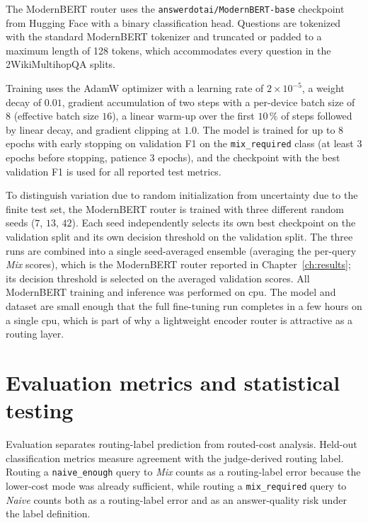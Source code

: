 \documentclass[english, bibtex]{kththesis}               %
\numberwithin{listing}{chapter}
\begin{document}
The ModernBERT router uses the \texttt{answerdotai/ModernBERT-base} checkpoint from Hugging Face \cite{warner2024modernbert} with a binary classification head. Questions are tokenized with the standard ModernBERT tokenizer and truncated or padded to a maximum length of 128 tokens, which accommodates every question in the 2WikiMultihopQA splits.

Training uses the AdamW optimizer \cite{loshchilov2019decoupled} with a learning rate of $2 \times 10^{-5}$, a weight decay of $0.01$, gradient accumulation of two steps with a per-device batch size of $8$ (effective batch size $16$), a linear warm-up over the first $10\,\%$ of steps followed by linear decay, and gradient clipping at $1.0$. The model is trained for up to $8$ epochs with early stopping on validation F1 on the \texttt{mix\_required} class (at least $3$ epochs before stopping, patience $3$ epochs), and the checkpoint with the best validation F1 is used for all reported test metrics.

To distinguish variation due to random initialization from uncertainty due to the finite test set, the ModernBERT router is trained with three different random seeds ($7$, $13$, $42$). Each seed independently selects its own best checkpoint on the validation split and its own decision threshold on the validation split. The three runs are combined into a single seed-averaged ensemble (averaging the per-query \emph{Mix} scores), which is the ModernBERT router reported in Chapter~\ref{ch:results}; its decision threshold is selected on the averaged validation scores. All ModernBERT training and inference was performed on \gls{cpu}. The model and dataset are small enough that the full fine-tuning run completes in a few hours on a single \gls{cpu}, which is part of why a lightweight encoder router is attractive as a routing layer.

\section{Evaluation metrics and statistical testing}
\label{sec:methodEvaluation}

Evaluation separates routing-label prediction from routed-cost analysis. Held-out classification metrics measure agreement with the judge-derived routing label. Routing a \texttt{naive\_enough} query to \emph{Mix} counts as a routing-label error because the lower-cost mode was already sufficient, while routing a \texttt{mix\_required} query to \emph{Naive} counts both as a routing-label error and as an answer-quality risk under the label definition.
\end{document}
